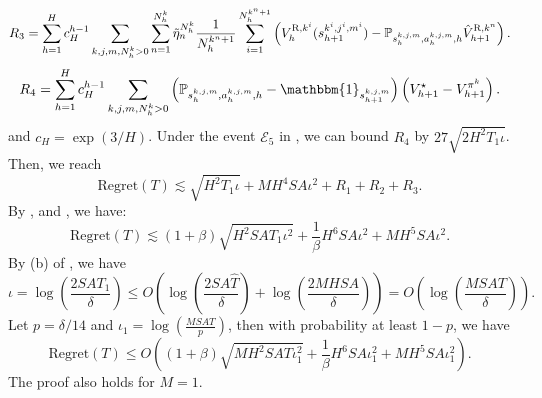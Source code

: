 \documentclass{article}
\newcommand{\R}{\textnormal{R}}
\begin{document}
\begin{equation*}
\label{R3}
    R_3 = \sum_{h=1}^H c_H^{h-1}\sum_{k,j,m,N_h^k >0}\sum_{n=1}^{N_h^k} \Tilde{\eta}_n^{N_h^k}\frac{1}{N_h^{k^n+1}} \sum_{i=1}^{N_h^{k^n+1}}\left(V_h^{\R,k^i}(s_{h+1}^{k^i,j^i,m^i})-\mathbb{P}_{s_h^{k,j,m}, a_h^{k,j,m},h}\hat{V}_{h+1}^{\R,k^n}\right).
\end{equation*}
\begin{equation*}
\label{R4}
    R_4 = \sum_{h=1}^H c_H^{h-1}\sum_{k,j,m,N_h^k >0}\left(\mathbb{P}_{s_h^{k,j,m}, a_h^{k,j,m},h}-\mathbbm{1}_{s_{h+1}^{k,j,m}}\right)\left(V_{h+1}^{\star} - V_{h+1}^{\pi^k}\right).
\end{equation*}
and $c_H = \exp(3/H)$.
Under the event $\mathcal{E}_5$ in , we can bound $R_4$ by $27\sqrt{2H^2T_1\iota}$. Then, we reach
$$\mbox{Regret}(T) \lesssim \sqrt{H^2T_1\iota} +MH^4SA\iota^2 + R_1+R_2+R_3.$$
By ,  and , we have:
$$\mbox{Regret}(T) \lesssim (1+\beta) \sqrt{H^2SAT_1\iota^2} + \frac{1}{\beta}H^6SA\iota^2+MH^5SA\iota^{2}.$$
By (b) of , we have
\begin{equation*}
    \iota = \log \left(\frac{2SAT_1}{\delta}\right) \leq O\left(\log\left(\frac{2SA\hat{T}}{\delta}\right) + \log\left(\frac{2MHSA}{\delta}\right)\right) = O\left(\log\left(\frac{MSAT}{\delta}\right)\right) .
\end{equation*}
Let $p = \delta /14$ and $\iota_1 =\log\left(\frac{MSAT}{p}\right)$, then with probability at least $1-p$, we have
$$\mbox{Regret}(T) \leq O\left((1+\beta) \sqrt{MH^2SAT\iota_1^2} + \frac{1}{\beta}H^6SA\iota_1^2+MH^5SA\iota_1^{2}\right).$$
The proof also holds for $M=1$.
\end{document}

